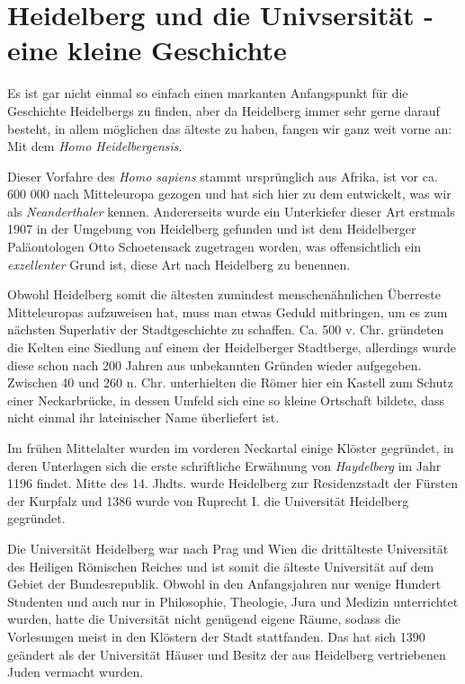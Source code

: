 
\section[Heidelberg und die Univsersität ]{Heidelberg und die Univsersität - eine kleine Geschichte}

Es ist gar nicht einmal so einfach einen markanten Anfangspunkt für die Geschichte Heidelbergs zu finden, aber da Heidelberg immer sehr gerne darauf besteht, in allem möglichen das älteste zu haben, fangen wir ganz weit vorne an: Mit dem \textit{Homo Heidelbergensis}.

Dieser Vorfahre des \textit{Homo sapiens} stammt ursprünglich aus Afrika, ist vor ca. 600 000 nach Mitteleuropa gezogen und hat sich hier zu dem entwickelt, was wir als \textit{Neanderthaler} kennen. Andererseits wurde ein Unterkiefer dieser Art erstmals 1907 in der Umgebung von Heidelberg gefunden und ist dem Heidelberger Paläontologen Otto Schoetensack zugetragen worden, was offensichtlich ein \textit{exzellenter} Grund ist, diese Art nach Heidelberg zu benennen.

Obwohl Heidelberg somit die ältesten zumindest menschenähnlichen Überreste Mitteleuropas aufzuweisen hat, muss man etwas Geduld mitbringen, um es zum nächsten Superlativ der Stadtgeschichte zu schaffen. Ca. 500 v. Chr. gründeten die Kelten eine Siedlung auf einem der Heidelberger Stadtberge, allerdings wurde diese schon nach 200 Jahren aus unbekannten Gründen wieder aufgegeben. Zwischen 40 und 260 n. Chr. unterhielten die Römer hier ein Kastell zum Schutz einer Neckarbrücke, in dessen Umfeld sich eine so kleine Ortschaft bildete, dass nicht einmal ihr lateinischer Name überliefert ist.

Im frühen Mittelalter wurden im vorderen Neckartal einige Klöster gegründet, in deren Unterlagen sich die erste schriftliche Erwähnung von \textit{Haydelberg} im Jahr 1196 findet. Mitte des 14. Jhdts. wurde Heidelberg zur Residenzstadt der Fürsten der Kurpfalz und 1386 wurde von Ruprecht I. die Universität Heidelberg gegründet.

Die Universität Heidelberg war nach Prag und Wien die drittälteste Universität des Heiligen Römischen Reiches und ist somit die älteste Universität auf dem Gebiet der Bundesrepublik. Obwohl in den Anfangsjahren nur wenige Hundert Studenten und auch nur in Philosophie, Theologie, Jura und Medizin unterrichtet wurden, hatte die Universität nicht genügend eigene Räume, sodass die Vorlesungen meist in den Klöstern der Stadt stattfanden. Das hat sich 1390 geändert als der Universität Häuser und Besitz der aus Heidelberg vertriebenen Juden vermacht wurden.

